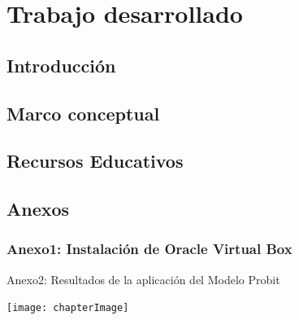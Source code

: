\documentclass[12pt,fleqn, twoside, letter]{book}
\numberwithin{equation}{section} %
\numberwithin{figure}{section} %
\numberwithin{table}{section} %
\begin{document}
\part{Trabajo desarrollado}\label{Parte2}

\chapter{Introducción}\label{Introduccion}


\chapter{Marco conceptual}\label{marcoConceptual}


\chapter{Recursos Educativos}



\chapter*{Anexos}

\section{Anexo1: Instalación de Oracle Virtual Box}



Anexo2: Resultados de la aplicación del Modelo Probit


\begin{center}
	\texttt{[image: chapterImage]}
\end{center}


\end{document}
